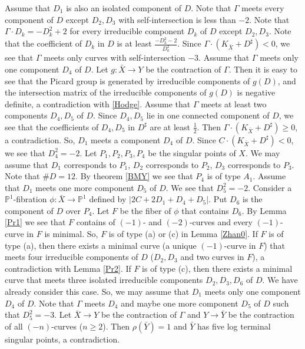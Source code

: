 \documentclass[10pt,oneside,reqno]{amsart}
\newcommand{\pp}{\mathbb{P}}
\theoremstyle{definition}
\theoremstyle{remark}
\numberwithin{equation}{section}
\begin{document}
Assume that $D_1$ is also an isolated component of $D$. Note that $\Gamma$ meets every component of $D$ except $D_2, D_3$ with self-intersection is less than $-2$. Note that $\Gamma\cdot D_k=-D_k^2+2$ for every irreducible component $D_k$ of $D$ except $D_2, D_3$. Note that the coefficient of $D_k$ in $D$ is at least $\frac{-D_k^2-2}{D_k^2}$. Since $\Gamma\cdot(K_{\bar{X}}+D^{\sharp})<0$, we see that $\Gamma$ meets only curves with self-intersection $-3$. Assume that $\Gamma$  meets only one component $D_4$ of $D$. Let $g\colon\bar{X}\rightarrow Y$ be the contraction of $\Gamma$. Then it is easy to see that the Picard group is generated by irreducible components of $g(D)$, and the intersection matrix of the irreducible components of $g(D)$ is negative definite, a contradiction with \ref{Hodge}. Assume that $\Gamma$  meets at least two components $D_4, D_5$ of $D$. Since $D_4, D_5$ lie in one connected component of $D$, we see that the coefficients of $D_4, D_5$ in $D^{\sharp}$ are at least $\frac{1}{2}$. Then $\Gamma\cdot(K_{\bar{X}}+D^{\sharp})\geq 0$, a contradiction. So, $D_1$ meets a component $D_4$ of $D$. Since $C\cdot(K_{\bar{X}}+D^{\sharp})<0$, we see that $D_4^2=-2$. Let $P_1, P_2, P_3, P_4$ be the singular points of $X$. We may assume that $D_1$ corresponds to $P_1$, $D_2$ corresponds to $P_2$, $D_3$ corresponds to $P_3$. Note that $\#D=12$. By theorem \ref{BMY} we see that $P_4$ is of type $A_1$.
Assume that $D_1$ meets one more component $D_5$ of $D$. We see that $D_5^2=-2$. Consider a $\pp^1$-fibration $\phi\colon\bar{X}\rightarrow\pp^1$ defined by $|2C+2D_1+D_4+D_5|$. Put $D_6$ is the component of $D$ over $P_4$. Let $F$ be the fiber of $\phi$ that contains $D_6$. By Lemma \ref{Pr1} we see that $F$ contains of $(-1)$- and $(-2)$-curves and every $(-1)$-curve in $F$ is minimal. So, $F$ is of type (a) or (c) in Lemma \ref{Zhan0}. If $F$ is of type (a), then there exists a minimal curve (a unique $(-1)$-curve in $F$) that meets four irreducible components of $D$ ($D_2,D_3$ and two curves in $F$), a contradiction with Lemma \ref{Pr2}.
If $F$ is of type (c), then there exists a minimal curve that meets three isolated irreducible components $D_2, D_3, D_6$ of $D$. We have already consider this case. So, we may assume that $D_1$ meets only one component $D_4$ of $D$. Note that $\Gamma$ meets $D_4$ and maybe one more component $D_5$ of $D$ such that $D_5^2=-3$. Let $\bar{X}\rightarrow Y$ be the contraction of $\Gamma$ and $Y\rightarrow\bar{Y}$ be the contraction of all $(-n)$-curves ($n\geq 2$). Then $\rho(\bar{Y})=1$ and $\bar{Y}$ has five log terminal singular points, a contradiction.
\end{document}
